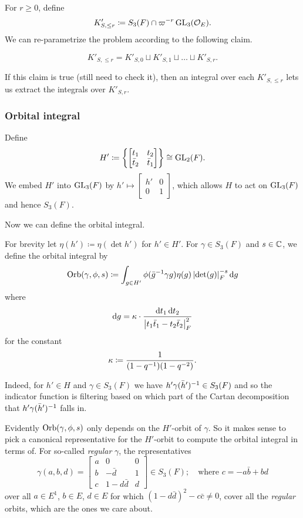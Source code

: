 For $r \geq 0$, define
\[ K'_{S, \le r} \coloneqq S_3(F) \cap \varpi^{-r} \operatorname{GL}_3(\mathcal O_E). \]
We can re-parametrize the problem according to the following claim.
\begin{claim}
  \[ K'_{S, \le r} = K'_{S,0} \sqcup K'_{S,1} \sqcup \dots \sqcup K'_{S,r}. \]
\end{claim}
If this claim is true (still need to check it),
then an integral over each $K'_{S, \le r}$ lets us extract the integrals over $K'_{S,r}$.

\subsubsection{Orbital integral}
Define
\[ H' \coloneqq
  \left\{ \begin{bmatrix} t_1 & t_2 \\ \bar t_2 & \bar t_1 \end{bmatrix} \right\}
  \cong \operatorname{GL}_2(F). \]
We embed $H'$ into $\operatorname{GL}_3(F)$ by
$h' \mapsto \left[ \begin{smallmatrix} h' & 0 \\ 0 & 1 \end{smallmatrix} \right]$,
which allows $H$ to act on $\operatorname{GL}_3(F)$ and hence $S_3(F)$.

Now we can define the orbital integral.
\begin{definition}
  For brevity let $\eta(h') \coloneqq \eta(\det h')$ for $h' \in H'$.
  For $\gamma \in S_3(F)$ and $s \in \mathbb C$, we define the orbital integral by
  \[ \Orb(\gamma, \phi, s) \coloneqq
    \int_{g \in H'} \phi(\bar g\inv \gamma g) \eta(g)
    \left\lvert \det(g) \right\rvert_F^{-s} \odif g \]
  where
  \[ \odif g = \kappa \cdot \frac{\odif t_1 \odif t_2}
    {\left\lvert t_1 \bar t_1 - t_2 \bar t_2 \right\rvert_F^2} \]
  for the constant
  \[ \kappa \coloneqq \frac{1}{(1-q^{-1})(1-q^{-2})}. \]
\end{definition}

Indeed, for $h' \in H$ and $\gamma \in S_3(F)$ we have $h' \gamma (\bar h')^{-1} \in S_3(F)$
and so the indicator function is filtering based on which part of the
Cartan decomposition that $h' \gamma (\bar h')^{-1}$ falls in.

Evidently $\operatorname{Orb}(\gamma, \phi, s)$ only depends on the $H'$-orbit of $\gamma$.
So it makes sense to pick a canonical representative for the $H'$-orbit to compute
the orbital integral in terms of.
For so-called \emph{regular} $\gamma$, the representatives
\[ \gamma(a,b,d) =
  \begin{bmatrix}
    a & 0 & 0 \\
    b & - \bar d & 1 \\
    c & 1 - d \bar d & d
  \end{bmatrix}
  \in S_3(F); \quad \text{where $c = -a \bar b + b d$} \]
over all $a \in E^1$, $b \in E$, $d \in E$ for which $(1-d\bar d)^2 - c \bar c \neq 0$,
cover all the \emph{regular} orbits, which are the ones we care about.

